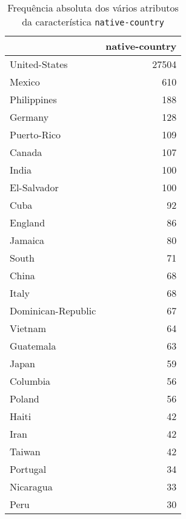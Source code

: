 \begin{table}
\centering
\caption{Frequência absoluta dos vários atributos da característica \texttt{native-country}}
\begin{tabular}{lr}
\toprule
{} &  native-country \\
\midrule
 United-States              &           27504 \\
 Mexico                     &             610 \\
 Philippines                &             188 \\
 Germany                    &             128 \\
 Puerto-Rico                &             109 \\
 Canada                     &             107 \\
 India                      &             100 \\
 El-Salvador                &             100 \\
 Cuba                       &              92 \\
 England                    &              86 \\
 Jamaica                    &              80 \\
 South                      &              71 \\
 China                      &              68 \\
 Italy                      &              68 \\
 Dominican-Republic         &              67 \\
 Vietnam                    &              64 \\
 Guatemala                  &              63 \\
 Japan                      &              59 \\
 Columbia                   &              56 \\
 Poland                     &              56 \\
 Haiti                      &              42 \\
 Iran                       &              42 \\
 Taiwan                     &              42 \\
 Portugal                   &              34 \\
 Nicaragua                  &              33 \\
 Peru                       &              30 \\

\end{tabular}
\end{table}
